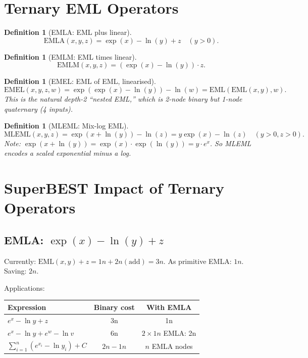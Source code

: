 \documentclass[11pt]{article}
\newtheorem{definition}[theorem]{Definition}
\begin{document}
\section{Ternary EML Operators}
\label{sec:ternary}

\begin{definition}[EMLA: EML plus linear]
\[
  \mathrm{EMLA}(x,y,z) = \exp(x) - \ln(y) + z
  \quad (y > 0).
\]
\end{definition}

\begin{definition}[EMLM: EML times linear]
\[
  \mathrm{EMLM}(x,y,z) = (\exp(x) - \ln(y)) \cdot z.
\]
\end{definition}

\begin{definition}[EMEL: EML of EML, linearised]
\[
  \mathrm{EMEL}(x,y,z,w) = \exp(\exp(x) - \ln(y)) - \ln(w)
  = \mathrm{EML}(\mathrm{EML}(x,y), w).
\]
This is the natural depth-2 ``nested EML,'' which is 2-node binary but
1-node quaternary (4 inputs).
\end{definition}

\begin{definition}[MLEML: Mix-log EML]
\[
  \mathrm{MLEML}(x,y,z) = \exp(x + \ln(y)) - \ln(z)
  = y \exp(x) - \ln(z)
  \quad (y > 0, z > 0).
\]
Note: $\exp(x + \ln(y)) = \exp(x) \cdot \exp(\ln(y)) = y \cdot e^x$.
So MLEML encodes a \emph{scaled exponential} minus a log.
\end{definition}

\section{SuperBEST Impact of Ternary Operators}
\label{sec:superbest}

\subsection{EMLA: $\exp(x) - \ln(y) + z$}

Currently: $\mathrm{EML}(x,y) + z = 1n + 2n(\mathrm{add}) = 3n$.
As primitive EMLA: $1n$. Saving: $2n$.

Applications:
\begin{center}
\begin{tabular}{lcc}
\toprule
Expression & Binary cost & With EMLA \\
\midrule
$e^x - \ln y + z$          & 3n & 1n \\
$e^x - \ln y + e^w - \ln v$ & 6n & $2 \times 1n$ EMLA: 2n \\
$\sum_{i=1}^n (e^{x_i} - \ln y_i) + C$ & $2n-1n$ & $n$ EMLA nodes \\
\bottomrule
\end{tabular}
\end{center}
\end{document}
